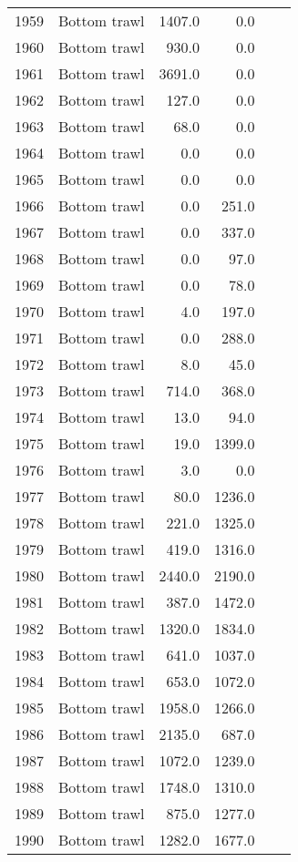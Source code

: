 \begin{longtable}[t]{llrrrr}
1959 & Bottom trawl & 1407.0 & 0.0 &  & \\
1960 & Bottom trawl & 930.0 & 0.0 &  & \\
1961 & Bottom trawl & 3691.0 & 0.0 &  & \\
1962 & Bottom trawl & 127.0 & 0.0 &  & \\
1963 & Bottom trawl & 68.0 & 0.0 &  & \\
1964 & Bottom trawl & 0.0 & 0.0 &  & \\
1965 & Bottom trawl & 0.0 & 0.0 &  & \\
1966 & Bottom trawl & 0.0 & 251.0 &  & \\
1967 & Bottom trawl & 0.0 & 337.0 &  & \\
1968 & Bottom trawl & 0.0 & 97.0 &  & \\
1969 & Bottom trawl & 0.0 & 78.0 &  & \\
1970 & Bottom trawl & 4.0 & 197.0 &  & \\
1971 & Bottom trawl & 0.0 & 288.0 &  & \\
1972 & Bottom trawl & 8.0 & 45.0 &  & \\
1973 & Bottom trawl & 714.0 & 368.0 &  & \\
1974 & Bottom trawl & 13.0 & 94.0 &  & \\
1975 & Bottom trawl & 19.0 & 1399.0 &  & \\
1976 & Bottom trawl & 3.0 & 0.0 &  & \\
1977 & Bottom trawl & 80.0 & 1236.0 &  & \\
1978 & Bottom trawl & 221.0 & 1325.0 &  & \\
1979 & Bottom trawl & 419.0 & 1316.0 &  & \\
1980 & Bottom trawl & 2440.0 & 2190.0 &  & \\
1981 & Bottom trawl & 387.0 & 1472.0 &  & \\
1982 & Bottom trawl & 1320.0 & 1834.0 &  & \\
1983 & Bottom trawl & 641.0 & 1037.0 &  & \\
1984 & Bottom trawl & 653.0 & 1072.0 &  & \\
1985 & Bottom trawl & 1958.0 & 1266.0 &  & \\
1986 & Bottom trawl & 2135.0 & 687.0 &  & \\
1987 & Bottom trawl & 1072.0 & 1239.0 &  & \\
1988 & Bottom trawl & 1748.0 & 1310.0 &  & \\
1989 & Bottom trawl & 875.0 & 1277.0 &  & \\
1990 & Bottom trawl & 1282.0 & 1677.0 &  & \\

\end{longtable}
